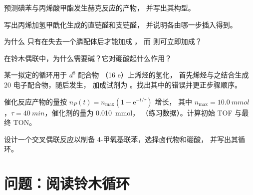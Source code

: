 \begin{exercise}[$\star\star$]\label{exo:b2:catalytic-cycles:6}
预测碘苯与丙烯酸甲酯发生赫克反应的产物，
并写出其构型。
\end{exercise}

\begin{exercise}[$\star\star$]\label{exo:b2:catalytic-cycles:7}
写出丙烯加氢甲酰化生成的直链醛和支链醛，
并说明各由哪一步插入得到。
\end{exercise}

\begin{exercise}[$\star\star$]\label{exo:b2:catalytic-cycles:8}
为什么  只有在失去一个膦配体后才能加成 ，
而  则可立即加成？
\end{exercise}

\begin{exercise}[$\star\star$]\label{exo:b2:catalytic-cycles:9}
在铃木偶联中，为什么需要碱？它对硼酸起什么作用？
\end{exercise}

\begin{exercise}[$\star\star\star$]\label{exo:b2:catalytic-cycles:10}
某一拟定的循环用于 $d^8$ 配合物 （16 e）上烯烃的氢化，
首先烯烃与之结合生成 20 电子配合物，随后发生，
加成试剂为 。找出其中的错误并更正步骤顺序。
\end{exercise}

\begin{exercise}[$\star\star\star$]\label{exo:b2:catalytic-cycles:11}
催化反应产物的量按 $n_P(t) = n_{\max}(1 - \mathrm e^{-t/\tau})$ 增长，
其中 $n_{\max} = \qty{10.0}{mmol}$，$\tau = \qty{40}{min}$，催化剂的量为 \qty{0.010}{mmol}，
（练习数据）。计算初始 TOF 与最终 TON。
\end{exercise}

\begin{exercise}[$\star\star\star$]\label{exo:b2:catalytic-cycles:12}
设计一个交叉偶联反应以制备 4-甲氧基联苯，选择卤代物和硼酸，
并写出其循环。
\end{exercise}

\section{问题：阅读铃木循环}

